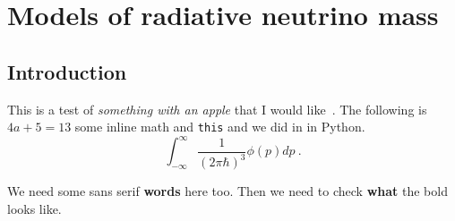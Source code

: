 \graphicspath{{img/chapter_3/}}

\chapter{Models of radiative neutrino mass}
\label{chapter:models-of-radiative-neutrino-mass}

\section{Introduction}

This is a test of \textit{something with an apple} that I would like~\cite{Weinberg:1967tq}.
The following is $4a + 5 = 13$ some inline math and \texttt{this} and we did in in \textsf{Python}.
\begin{equation}
  \label{eq:1}
  \int_{-\infty}^{\infty} \frac{1}{(2\pi \hbar)^{3}} \phi(p) dp \ .
\end{equation}

\textsf{We need some sans serif \textbf{words} here too.} Then we need to check
\textbf{what} the bold looks like.

